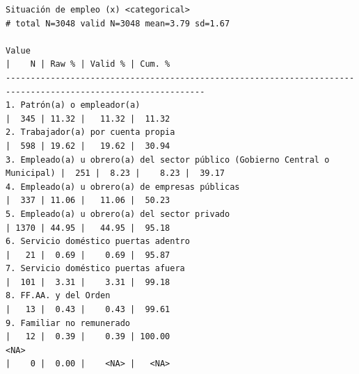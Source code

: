 \documentclass[
  letterpaper,
  DIV=11,
  numbers=noendperiod]{scrreprt}
\newenvironment{Shaded}{\begin{snugshade}}{\end{snugshade}}
\newcommand{\AttributeTok}[1]{\textcolor[rgb]{0.40,0.45,0.13}{#1}}
\newcommand{\ConstantTok}[1]{\textcolor[rgb]{0.56,0.35,0.01}{#1}}
\newcommand{\DecValTok}[1]{\textcolor[rgb]{0.68,0.00,0.00}{#1}}
\newcommand{\FunctionTok}[1]{\textcolor[rgb]{0.28,0.35,0.67}{#1}}
\newcommand{\NormalTok}[1]{\textcolor[rgb]{0.00,0.23,0.31}{#1}}
\newcommand{\OtherTok}[1]{\textcolor[rgb]{0.00,0.23,0.31}{#1}}
\newcommand{\SpecialCharTok}[1]{\textcolor[rgb]{0.37,0.37,0.37}{#1}}
\newcommand{\StringTok}[1]{\textcolor[rgb]{0.13,0.47,0.30}{#1}}
\begin{document}
\begin{verbatim}
Situación de empleo (x) <categorical> 
# total N=3048 valid N=3048 mean=3.79 sd=1.67

Value                                                                        |    N | Raw % | Valid % | Cum. %
--------------------------------------------------------------------------------------------------------------
1. Patrón(a) o empleador(a)                                                  |  345 | 11.32 |   11.32 |  11.32
2. Trabajador(a) por cuenta propia                                           |  598 | 19.62 |   19.62 |  30.94
3. Empleado(a) u obrero(a) del sector público (Gobierno Central o Municipal) |  251 |  8.23 |    8.23 |  39.17
4. Empleado(a) u obrero(a) de empresas públicas                              |  337 | 11.06 |   11.06 |  50.23
5. Empleado(a) u obrero(a) del sector privado                                | 1370 | 44.95 |   44.95 |  95.18
6. Servicio doméstico puertas adentro                                        |   21 |  0.69 |    0.69 |  95.87
7. Servicio doméstico puertas afuera                                         |  101 |  3.31 |    3.31 |  99.18
8. FF.AA. y del Orden                                                        |   13 |  0.43 |    0.43 |  99.61
9. Familiar no remunerado                                                    |   12 |  0.39 |    0.39 | 100.00
<NA>                                                                         |    0 |  0.00 |    <NA> |   <NA>
\end{verbatim}

\begin{Shaded}
\end{Shaded}
\end{document}
